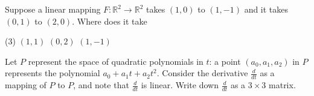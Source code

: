 \documentclass{ximera}
\begin{document}
\begin{exercise}%
    Suppose a linear mapping $F \colon {\mathbb R}^2 \to {\mathbb R}^2$ takes $(1,0)$ to $(1,-1)$ and it takes $(0,1)$ to $(2,0)$. Where does it take
    \begin{tasks}(3)
        \task  $(1,1)$
        \task  $(0,2)$
        \task  $(1,-1)$
    \end{tasks}
\end{exercise}

\begin{exercise}%
    Let $P$ represent the space of quadratic polynomials  in $t$: a point $(a_0,a_1,a_2)$ in $P$ represents  the polynomial $a_0 + a_1 t + a_2 t^2$.  Consider the derivative $\frac{d}{dt}$ as a mapping of $P$ to  $P$,  and note that $\frac{d}{dt}$ is linear.  Write down $\frac{d}{dt}$ as a $3 \times 3$ matrix.
\end{exercise}
%
\end{document}
